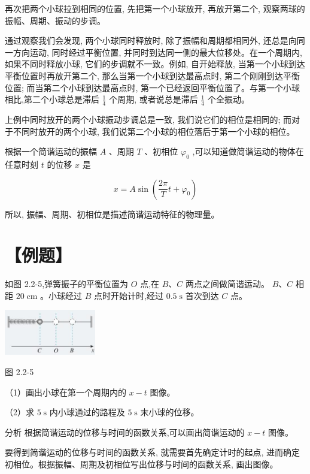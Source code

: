 \documentclass[10pt]{article}
\begin{document}
再次把两个小球拉到相同的位置, 先把第一个小球放开, 再放开第二个, 观察两球的振幅、周期、振动的步调。

通过观察我们会发现, 两个小球同时释放时, 除了振幅和周期都相同外, 还总是向同一方向运动, 同时经过平衡位置, 并同时到达同一侧的最大位移处。在一个周期内, 如果不同时释放小球, 它们的步调就不一致。例如, 自开始释放, 当第一个小球到达平衡位置时再放开第二个, 那么当第一个小球到达最高点时, 第二个刚刚到达平衡位置; 而当第二个小球到达最高点时, 第一个已经返回平衡位置了。与第一个小球相比,第二个小球总是滞后 \(\frac{1}{4}\) 个周期, 或者说总是滞后 \(\frac{1}{4}\) 个全振动。

上例中同时放开的两个小球振动步调总是一致, 我们说它们的相位是相同的; 而对于不同时放开的两个小球, 我们说第二个小球的相位落后于第一个小球的相位。

根据一个简谐运动的振幅 \(A\) 、周期 \(T\) 、初相位 \({\varphi }_{0}\) ,可以知道做简谐运动的物体在任意时刻 \(t\) 的位移 \(x\) 是

\[
x = A\sin \left( {\frac{2\pi }{T}t + {\varphi }_{0}}\right)
\]

所以, 振幅、周期、初相位是描述简谐运动特征的物理量。

\section*{【例题】}

如图 2.2-5,弹簧振子的平衡位置为 \(O\) 点,在 \(B\text{、}C\) 两点之间做简谐运动。 \(B\text{、}C\) 相距 \({20}\mathrm{\;{cm}}\) 。小球经过 \(B\) 点时开始计时,经过 \({0.5}\mathrm{\;s}\) 首次到达 \(C\) 点。

\begin{center}
\includegraphics[max width=0.3\textwidth]{images/01910e4c-ebb8-7d2c-8f2f-2375bc1d2d12_44_575134.jpg}
\end{center}

图 2.2-5

（1）画出小球在第一个周期内的 \(x - t\) 图像。

（2）求 \(5\mathrm{\;s}\) 内小球通过的路程及 \(5\mathrm{\;s}\) 末小球的位移。

分析 根据简谐运动的位移与时间的函数关系,可以画出简谐运动的 \(x - t\) 图像。

要得到简谐运动的位移与时间的函数关系, 就需要首先确定计时的起点, 进而确定初相位。根据振幅、周期及初相位写出位移与时间的函数关系, 画出图像。
\end{document}
